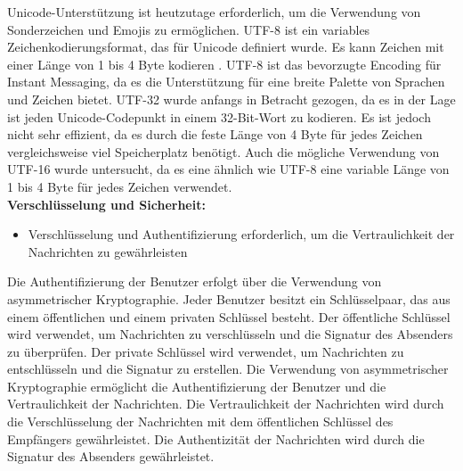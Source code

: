 \noindent Unicode-Unterstützung ist heutzutage erforderlich, um die Verwendung von Sonderzeichen und Emojis zu ermöglichen. UTF-8 ist ein variables Zeichenkodierungsformat, das für Unicode definiert wurde. Es kann Zeichen mit einer Länge von 1 bis 4 Byte kodieren \parencite[S. 4]{rfc3629_utf-8}. UTF-8 ist das bevorzugte Encoding für Instant Messaging, da es die Unterstützung für eine breite Palette von Sprachen und Zeichen bietet. UTF-32 wurde anfangs in Betracht gezogen, da es in der Lage ist jeden Unicode-Codepunkt in einem 32-Bit-Wort zu kodieren. Es ist jedoch nicht sehr effizient, da es durch die feste Länge von 4 Byte für jedes Zeichen vergleichsweise viel Speicherplatz benötigt. Auch die mögliche Verwendung von UTF-16 wurde untersucht, da es eine ähnlich wie UTF-8 eine variable Länge von 1 bis 4 Byte für jedes Zeichen verwendet. 
\\

\noindent \textbf{Verschlüsselung und Sicherheit:}
\begin{itemize}
    \item Verschlüsselung und Authentifizierung erforderlich, um die Vertraulichkeit der Nachrichten zu gewährleisten
\end{itemize}

\noindent Die Authentifizierung der Benutzer erfolgt über die Verwendung von asymmetrischer Kryptographie. Jeder Benutzer besitzt ein Schlüsselpaar, das aus einem öffentlichen und einem privaten Schlüssel besteht. Der öffentliche Schlüssel wird verwendet, um Nachrichten zu verschlüsseln und die Signatur des Absenders zu überprüfen. Der private Schlüssel wird verwendet, um Nachrichten zu entschlüsseln und die Signatur zu erstellen. Die Verwendung von asymmetrischer Kryptographie ermöglicht die Authentifizierung der Benutzer und die Vertraulichkeit der Nachrichten. Die Vertraulichkeit der Nachrichten wird durch die Verschlüsselung der Nachrichten mit dem öffentlichen Schlüssel des Empfängers gewährleistet. Die Authentizität der Nachrichten wird durch die Signatur des Absenders gewährleistet. 